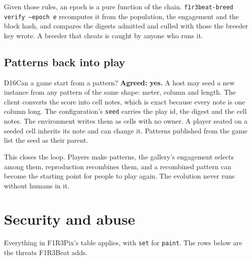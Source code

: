 \documentclass[11pt,a4paper]{article}
\newcommand{\code}[1]{\texttt{#1}}
\begin{document}
Given those rules, an epoch is a pure function of the chain. \code{f1r3beat-breed verify
--epoch e} recomputes it from the population, the engagement and the block hash, and compares
the digests admitted and culled with those the breeder key wrote. A breeder that cheats is
caught by anyone who runs it.

\subsection{Patterns back into play}

\begin{decision}{D16}{Can a game start from a pattern?}
\textbf{Agreed: yes.} A host may seed a new instance from any pattern of the same shape:
meter, column and length. The client converts the score into cell notes, which is exact
because every note is one column long. The configuration's \code{seed} carries the play id, the digest and the cell
notes. The environment writes them as cells with no owner. A player seated on a seeded cell
inherits its note and can change it. Patterns published from the game list the seed as their
parent.

This closes the loop. Players make patterns, the gallery's engagement selects among them,
reproduction recombines them, and a recombined pattern can become the starting point for
people to play again. The evolution never runs without humans in it.
\end{decision}
\section{Security and abuse}\label{sec:security}

Everything in F1R3Pix's table applies, with \code{set} for \code{paint}. The rows below are
the threats F1R3Beat adds.
\end{document}
